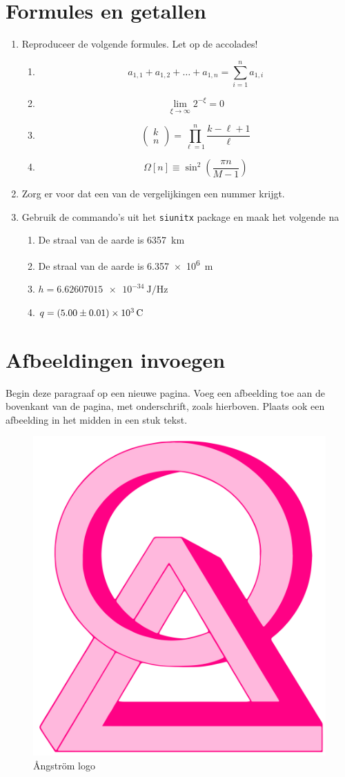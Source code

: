 \documentclass{article}
\begin{document}
\section{Formules en getallen}
\begin{enumerate}
	\item Reproduceer de volgende formules. Let op de accolades!
	      \begin{enumerate}
		      \item \[ a_{1,1} + a_{1,2} + \ldots + a_{1,n} = \sum_{i=1}^{n} a_{1,i} \]
		      \item \[ \lim_{\xi \to \infty} 2^{-\xi} = 0 \]
		      \item \[ \begin{pmatrix} k\\n  \end{pmatrix} = \prod_{\ell=1}^{n} \frac{k-\ell+1 }{\ell} \]
		      \item \[ \Omega[n] \equiv \sin^2\left( \frac{\pi n}{M - 1} \right) \]
	      \end{enumerate}
	\item Zorg er voor dat een van de vergelijkingen een nummer krijgt.
	\item Gebruik de commando's uit het \texttt{siunitx} package en maak het volgende na
	      \begin{enumerate}
		      \item De straal van de aarde is \qty{6 357}{\kilo\metre}
		      \item De straal van de aarde is \qty{6.357e6}{\metre}
		      \item \( h = \qty{6.62607015e-34}{\joule\per\hertz} \)
		      \item \( q = \qty{5+-0.01e3}{\coulomb} \)
	      \end{enumerate}

\end{enumerate}

\newpage
\section{Afbeeldingen invoegen}
Begin deze paragraaf op een nieuwe pagina.
Voeg een afbeelding toe aan de bovenkant van de pagina, met onderschrift, zoals hierboven. Plaats ook een afbeelding in het midden in een stuk tekst.

\begin{figure}[t]
	\begin{center}
		\includegraphics[width=0.3\linewidth]{logo.pdf}
	\end{center}
	\caption{Ångström logo}
\end{figure}
\end{document}
